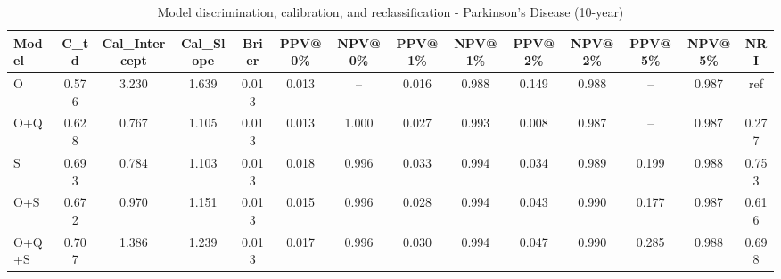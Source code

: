 \begin{table}[htbp]
\centering
\small
\caption{Model discrimination, calibration, and reclassification - Parkinson's Disease (10-year)}
\label{tab:perf_pd_10y}
\begin{tabular}{lccccccccccccc}
\toprule
Model & C\_td & Cal\_Intercept & Cal\_Slope & Brier & PPV@0\% & NPV@0\% & PPV@1\% & NPV@1\% & PPV@2\% & NPV@2\% & PPV@5\% & NPV@5\% & NRI \\
\midrule
O & 0.576 & 3.230 & 1.639 & 0.013 & 0.013 & -- & 0.016 & 0.988 & 0.149 & 0.988 & -- & 0.987 & ref \\
O+Q & 0.628 & 0.767 & 1.105 & 0.013 & 0.013 & 1.000 & 0.027 & 0.993 & 0.008 & 0.987 & -- & 0.987 & 0.277 \\
S & 0.693 & 0.784 & 1.103 & 0.013 & 0.018 & 0.996 & 0.033 & 0.994 & 0.034 & 0.989 & 0.199 & 0.988 & 0.753 \\
O+S & 0.672 & 0.970 & 1.151 & 0.013 & 0.015 & 0.996 & 0.028 & 0.994 & 0.043 & 0.990 & 0.177 & 0.987 & 0.616 \\
O+Q+S & 0.707 & 1.386 & 1.239 & 0.013 & 0.017 & 0.996 & 0.030 & 0.994 & 0.047 & 0.990 & 0.285 & 0.988 & 0.698 \\
\bottomrule
\end{tabular}
\end{table}